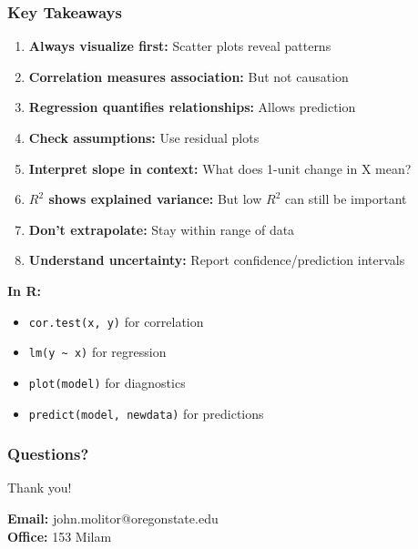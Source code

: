 \documentclass{beamer}
\begin{document}
\begin{frame}
\frametitle{Key Takeaways}
\begin{enumerate}
\item \textbf{Always visualize first:} Scatter plots reveal patterns

\item \textbf{Correlation measures association:} But not causation

\item \textbf{Regression quantifies relationships:} Allows prediction

\item \textbf{Check assumptions:} Use residual plots

\item \textbf{Interpret slope in context:} What does 1-unit change in X mean?

\item \textbf{$R^2$ shows explained variance:} But low $R^2$ can still be important

\item \textbf{Don't extrapolate:} Stay within range of data

\item \textbf{Understand uncertainty:} Report confidence/prediction intervals
\end{enumerate}

\vspace{0.5cm}
\textbf{In R:}
\begin{itemize}
\item \texttt{cor.test(x, y)} for correlation
\item \texttt{lm(y \textasciitilde\ x)} for regression
\item \texttt{plot(model)} for diagnostics
\item \texttt{predict(model, newdata)} for predictions
\end{itemize}
\end{frame}

\begin{frame}
\frametitle{Questions?}
\begin{center}
\Large{Thank you!}

\vspace{1cm}

\textbf{Email:} john.molitor@oregonstate.edu\\
\textbf{Office:} 153 Milam
\end{center}
\end{frame}
\end{document}
